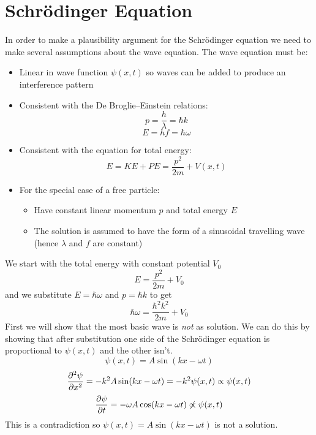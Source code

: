\documentclass{article}
\begin{document}
    \section{Schr\"odinger Equation}
    In order to make a plausibility argument for the Schr\"odinger equation we need to make several assumptions about the wave equation.
    The wave equation must be:
    \begin{itemize} 
        \item Linear in wave function \(\psi(x, t)\) so waves can be added to produce an interference pattern
        \item Consistent with the De Broglie--Einstein relations:
        \[p = \frac{h}{\lambda} = \hbar k\]
        \[E = hf = \hbar \omega\]
        \item Consistent with the equation for total energy:
        \[E = KE + PE = \frac{p^2}{2m} + V(x, t)\]
        \item For the special case of a free particle:
        \begin{itemize}
            \item Have constant linear momentum \(p\) and total energy \(E\)
            \item The solution is assumed to have the form of a sinusoidal travelling wave (hence \(\lambda\) and \(f\) are constant)
        \end{itemize}
    \end{itemize}
    We start with the total energy with constant potential \(V_0\)
    \[E = \frac{p^2}{2m} + V_0\]
    and we substitute \(E=\hbar \omega\) and \(p = \hbar k\) to get
    \begin{equation}\label{eqn:total energy}
        \hbar \omega = \frac{\hbar^2k^2}{2m} + V_0
    \end{equation}
    First we will show that the most basic wave is \emph{not} as solution.
    We can do this by showing that after substitution one side of the Schr\"odinger equation is proportional to \(\psi(x, t)\) and the other isn't.
    \[\psi(x, t) = A\sin(kx - \omega t)\]
    \[\pdv[2]{\psi}{x} = -k^2A\sin(kx - \omega t) = -k^2\psi(x, t)\propto \psi(x, t)\]
    \[\pdv{\psi}{t} = -\omega A\cos(kx-\omega t)\not\propto \psi(x, t)\]
    This is a contradiction so \(\psi(x, t) = A\sin(kx - \omega t)\) is not a solution.
    
\end{document}
